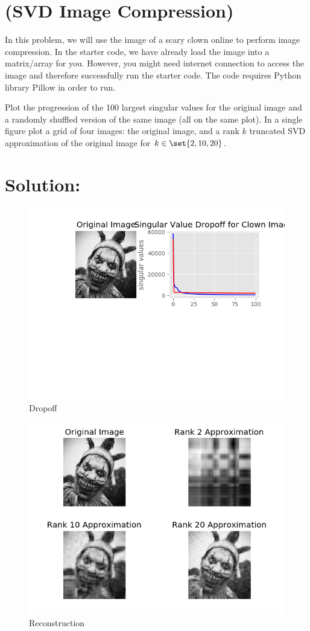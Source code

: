 \documentclass[189]{pset}
\begin{document}

  \section{(SVD Image Compression)}
    In this problem, we will use the image of a scary clown online to
    perform image compression.  In the starter code, we have already
    load the image into a matrix/array for you. However, you might
    need internet connection to access the image and therefore
    successfully run the starter code. The code requires Python
    library Pillow in order to run.

    Plot the progression of the 100 largest singular values for the
    original image and a randomly shuffled version of the same image
    (all on the same plot). In a single figure plot a grid of four
    images: the original image, and a rank $k$ truncated SVD
    approximation of the original image for $k \in \set{2,10,20}$.

  \hrulefill

  \section*{Solution:}
  \begin{figure}[H]
    \centering
    \includegraphics{dropoff.png}
    \caption{Dropoff}
    \label{fig:drop}
  \end{figure}
  \begin{figure}[H]
    \centering
    \includegraphics{reconstruction.png}
    \caption{Reconstruction}
    \label{fig:rec}
  \end{figure}
\end{document}
